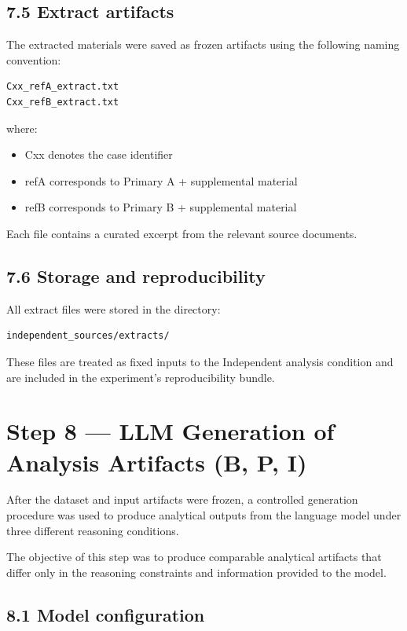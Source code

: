 {\subsection*{7.5 Extract artifacts}

The extracted materials were saved as frozen artifacts using the following naming convention:

\begin{verbatim}
Cxx_refA_extract.txt
Cxx_refB_extract.txt
\end{verbatim}

where:

\begin{itemize}
\item Cxx denotes the case identifier
\item refA corresponds to Primary A + supplemental material
\item refB corresponds to Primary B + supplemental material
\end{itemize}

Each file contains a curated excerpt from the relevant source documents.

\subsection*{7.6 Storage and reproducibility}

All extract files were stored in the directory:

\begin{verbatim}
independent_sources/extracts/
\end{verbatim}

These files are treated as fixed inputs to the Independent analysis condition and are included in the experiment’s reproducibility bundle.

\section*{Step 8 — LLM Generation of Analysis Artifacts (B, P, I)}

After the dataset and input artifacts were frozen, a controlled generation procedure was used to produce analytical outputs from the language model under three different reasoning conditions.

The objective of this step was to produce comparable analytical artifacts that differ only in the reasoning constraints and information provided to the model.

\subsection*{8.1 Model configuration}

}
